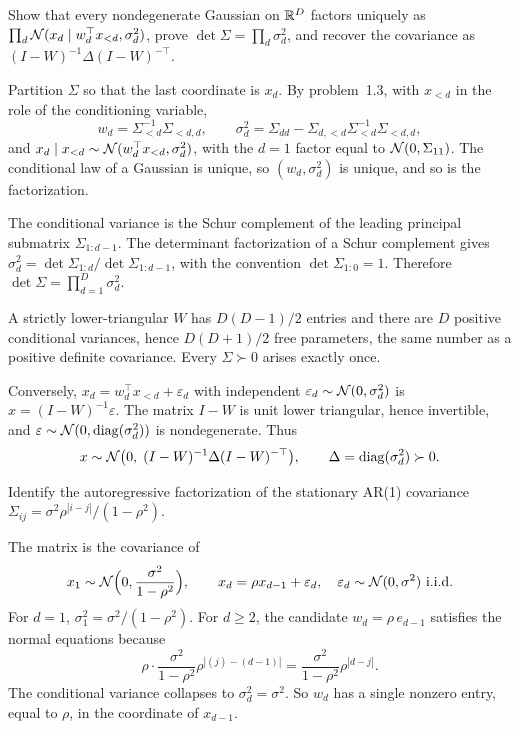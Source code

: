 \begin{hwqbox}
Show that every nondegenerate Gaussian on $\mathbb{R}^D$ factors uniquely as $\prod_d\mathcal{N}(x_d\mid w_d^\top x_{<d},\sigma_d^2)$, prove $\det\Sigma=\prod_d\sigma_d^2$, and recover the covariance as $(I-W)^{-1}\Delta(I-W)^{-\top}$.
\end{hwqbox}
\begin{hwsolbox}
Partition $\Sigma$ so that the last coordinate is $x_d$. By problem~1.3, with $x_{<d}$ in the role of the conditioning variable,
\[
w_d=\Sigma_{<d}^{-1}\Sigma_{<d,d},\qquad
\sigma_d^2=\Sigma_{dd}-\Sigma_{d,<d}\Sigma_{<d}^{-1}\Sigma_{<d,d},
\]
and $x_d\mid x_{<d}\sim\mathcal{N}(w_d^\top x_{<d},\sigma_d^2)$, with the $d=1$ factor equal to $\mathcal{N}(0,\Sigma_{11})$. The conditional law of a Gaussian is unique, so $(w_d,\sigma_d^2)$ is unique, and so is the factorization.

The conditional variance is the Schur complement of the leading principal submatrix $\Sigma_{1:d-1}$. The determinant factorization of a Schur complement gives $\sigma_d^2=\det\Sigma_{1:d}/\det\Sigma_{1:d-1}$, with the convention $\det\Sigma_{1:0}=1$. Therefore $\det\Sigma=\prod_{d=1}^D\sigma_d^2$.

A strictly lower-triangular $W$ has $D(D-1)/2$ entries and there are $D$ positive conditional variances, hence $D(D+1)/2$ free parameters, the same number as a positive definite covariance. Every $\Sigma\succ 0$ arises exactly once.

Conversely, $x_d=w_d^\top x_{<d}+\varepsilon_d$ with independent $\varepsilon_d\sim\mathcal{N}(0,\sigma_d^2)$ is $x=(I-W)^{-1}\varepsilon$. The matrix $I-W$ is unit lower triangular, hence invertible, and $\varepsilon\sim\mathcal{N}(0,\operatorname{diag}(\sigma_d^2))$ is nondegenerate. Thus
\[
x\sim\mathcal{N}\big(0,\;(I-W)^{-1}\Delta(I-W)^{-\top}\big),\qquad\Delta=\operatorname{diag}(\sigma_d^2)\succ 0.
\]
\end{hwsolbox}

\begin{hwqbox}
Identify the autoregressive factorization of the stationary AR(1) covariance $\Sigma_{ij}=\sigma^2\rho^{|i-j|}/(1-\rho^2)$.
\end{hwqbox}
\begin{hwsolbox}
The matrix is the covariance of
\[
x_1\sim\N\Big(0,\frac{\sigma^2}{1-\rho^2}\Big),\qquad
x_d=\rho x_{d-1}+\varepsilon_d,\quad\varepsilon_d\sim\N(0,\sigma^2)\ \text{i.i.d.}
\]
For $d=1$, $\sigma_1^2=\sigma^2/(1-\rho^2)$. For $d\ge 2$, the candidate $w_d=\rho\,e_{d-1}$ satisfies the normal equations because
\[
\rho\cdot\frac{\sigma^2}{1-\rho^2}\rho^{|(j)-(d-1)|}
=\frac{\sigma^2}{1-\rho^2}\rho^{|d-j|}.
\]
The conditional variance collapses to $\sigma_d^2=\sigma^2$. So $w_d$ has a single nonzero entry, equal to $\rho$, in the coordinate of $x_{d-1}$.
\end{hwsolbox}

